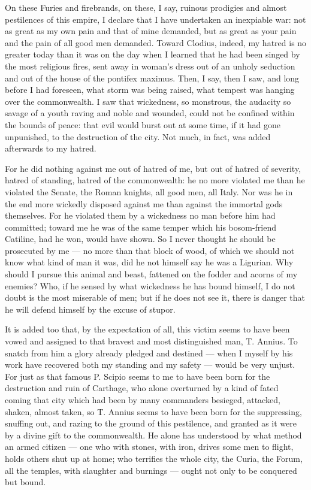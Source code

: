  On these Furies and firebrands, on these, I say, ruinous prodigies and almost pestilences of this empire, I declare that I have undertaken an inexpiable war: not as great as my own pain and that of mine demanded, but as great as your pain and the pain of all good men demanded. Toward Clodius, indeed, my hatred is no greater today than it was on the day when I learned that he had been singed by the most religious fires, sent away in woman's dress out of an unholy seduction and out of the house of the pontifex maximus. Then, I say, then I saw, and long before I had foreseen, what storm was being raised, what tempest was hanging over the commonwealth. I saw that wickedness, so monstrous, the audacity so savage of a youth raving and noble and wounded, could not be confined within the bounds of peace: that evil would burst out at some time, if it had gone unpunished, to the destruction of the city. Not much, in fact, was added afterwards to my hatred.

 For he did nothing against me out of hatred of me, but out of hatred of severity, hatred of standing, hatred of the commonwealth: he no more violated me than he violated the Senate, the Roman knights, all good men, all Italy. Nor was he in the end more wickedly disposed against me than against the immortal gods themselves. For he violated them by a wickedness no man before him had committed; toward me he was of the same temper which his bosom-friend Catiline, had he won, would have shown. So I never thought he should be prosecuted by me --- no more than that block of wood, of which we should not know what kind of man it was, did he not himself say he was a Ligurian. Why should I pursue this animal and beast, fattened on the fodder and acorns of my enemies? Who, if he sensed by what wickedness he has bound himself, I do not doubt is the most miserable of men; but if he does not see it, there is danger that he will defend himself by the excuse of stupor.

 It is added too that, by the expectation of all, this victim seems to have been vowed and assigned to that bravest and most distinguished man, T. Annius. To snatch from him a glory already pledged and destined --- when I myself by his work have recovered both my standing and my safety --- would be very unjust. For just as that famous P. Scipio seems to me to have been born for the destruction and ruin of Carthage, who alone overturned by a kind of fated coming that city which had been by many commanders besieged, attacked, shaken, almost taken, so T. Annius seems to have been born for the suppressing, snuffing out, and razing to the ground of this pestilence, and granted as it were by a divine gift to the commonwealth. He alone has understood by what method an armed citizen --- one who with stones, with iron, drives some men to flight, holds others shut up at home; who terrifies the whole city, the Curia, the Forum, all the temples, with slaughter and burnings --- ought not only to be conquered but bound.


